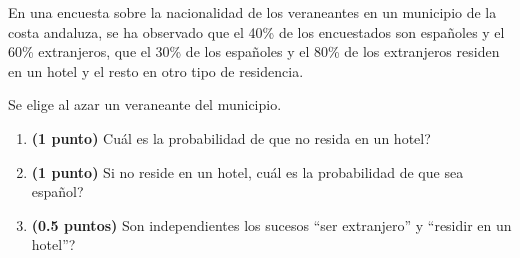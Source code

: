 
En una encuesta sobre la nacionalidad de los veraneantes en un municipio de la costa andaluza, se ha observado que el 40\% de los encuestados son españoles y el 60\% extranjeros, que el 30\% de los españoles y el 80\% de los extranjeros residen en un hotel y el resto en otro tipo de residencia.

Se elige al azar un veraneante del municipio.
\begin{enumerate}[label=\alph*)]
\item \textbf{(1 punto)} \textquestiondown{}Cuál es la probabilidad de que no resida en un hotel?
\item \textbf{(1 punto)} Si no reside en un hotel, \textquestiondown{}cuál es la probabilidad de que sea español?
\item \textbf{(0.5 puntos)} \textquestiondown{}Son independientes los sucesos ``ser extranjero'' y ``residir en un hotel''?
\end{enumerate}
